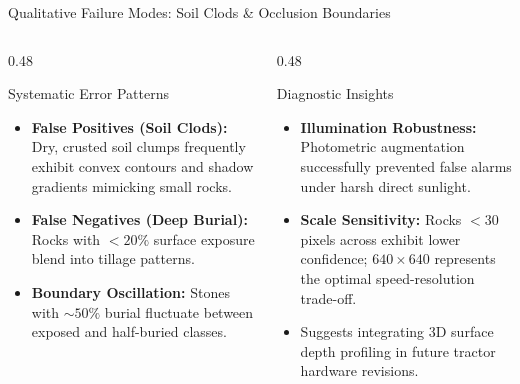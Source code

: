 \documentclass[aspectratio=169,10pt]{beamer}
\begin{document}
\begin{frame}{Qualitative Failure Modes: Soil Clods \& Occlusion Boundaries}
\begin{columns}[T]
  \begin{column}{0.48\textwidth}
    \begin{block}{\small Systematic Error Patterns}
      \small
      \begin{itemize}
        \item \textbf{False Positives (Soil Clods):} Dry, crusted soil clumps frequently exhibit convex contours and shadow gradients mimicking small rocks.
        \item \textbf{False Negatives (Deep Burial):} Rocks with $<20\%$ surface exposure blend into tillage patterns.
        \item \textbf{Boundary Oscillation:} Stones with $\sim 50\%$ burial fluctuate between exposed and half-buried classes.
      \end{itemize}
    \end{block}
  \end{column}
  \begin{column}{0.48\textwidth}
    \begin{block}{\small Diagnostic Insights}
      \small
      \begin{itemize}
        \item \textbf{Illumination Robustness:} Photometric augmentation successfully prevented false alarms under harsh direct sunlight.
        \item \textbf{Scale Sensitivity:} Rocks $<30$ pixels across exhibit lower confidence; $640\times640$ represents the optimal speed-resolution trade-off.
        \item Suggests integrating 3D surface depth profiling in future tractor hardware revisions.
      \end{itemize}
    \end{block}
  \end{column}
\end{columns}
\end{frame}

\end{document}
